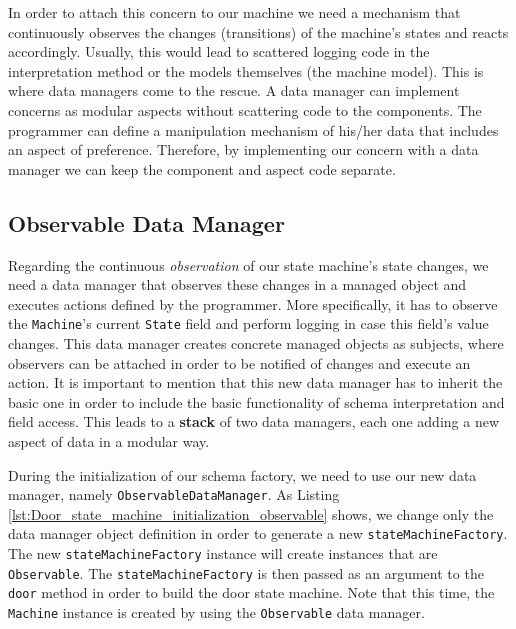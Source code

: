 In order to attach this concern to our machine we need a mechanism that continuously observes the changes (transitions) of the machine's states and reacts accordingly.
Usually, this would lead to scattered logging code in the interpretation method or the models themselves (the machine model).
This is where data managers come to the rescue.
A data manager can implement concerns as modular aspects without scattering code to the components.
The programmer can define a manipulation mechanism of his/her data that includes an aspect of preference.
Therefore, by implementing our concern with a data manager we can keep the component and aspect code separate.

\subsection{Observable Data Manager}
Regarding the continuous \textit{observation} of our state machine's state changes, we need a data manager that observes these changes in a managed object and executes actions defined by the programmer.
More specifically, it has to observe the \texttt{Machine}'s current \texttt{State} field and perform logging in case this field's value changes.
This data manager creates concrete managed objects as subjects, where observers can be attached in order to be notified of changes and execute an action.
It is important to mention that this new data manager has to inherit the basic one in order to include the basic functionality of schema interpretation and field access.
This leads to a \textbf{stack} of two data managers, each one adding a new aspect of data in a modular way.

During the initialization of our schema factory, we need to use our new data manager, namely \texttt{ObservableDataManager}.
As Listing \ref{lst:Door_state_machine_initialization_observable} shows, we change only the data manager object definition in order to generate a new \texttt{stateMachineFactory}.
The new \texttt{stateMachineFactory} instance will create instances that are \texttt{Observable}.
The \texttt{stateMachineFactory} is then passed as an argument to the \texttt{door} method in order to build the door state machine.
Note that this time, the \texttt{Machine} instance is created by using the \texttt{Observable} data manager.


